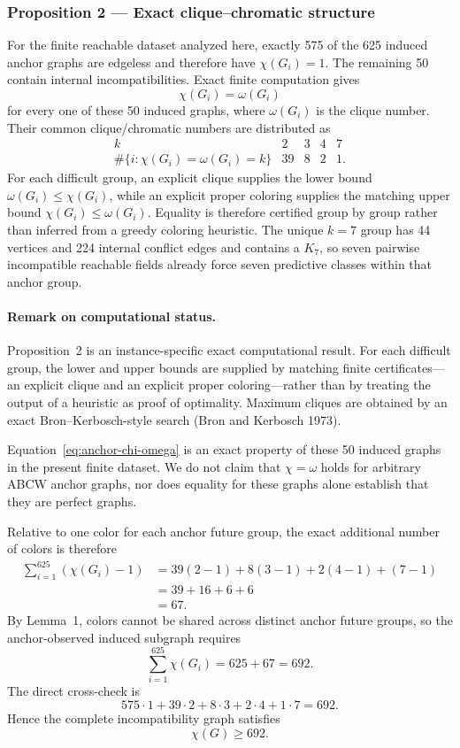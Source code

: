 \documentclass[
  11pt,
]{article}
\begin{document}
\subsubsection{Proposition 2 --- Exact clique--chromatic structure}\label{prop-anchor-cliques}

For the finite reachable dataset analyzed here, exactly 575 of the 625
induced anchor graphs are edgeless and therefore have \(\chi(G_i)=1\).
The remaining 50 contain internal incompatibilities.  Exact finite
computation gives
\[
 \chi(G_i)=\omega(G_i)
 \tag{22}\label{eq:anchor-chi-omega}
\]
for every one of these 50 induced graphs, where \(\omega(G_i)\) is the
clique number.  Their common clique/chromatic numbers are distributed as
\[
\begin{array}{c|rrrr}
 k&2&3&4&7\\ \hline
 \#\{i:\chi(G_i)=\omega(G_i)=k\}&39&8&2&1.
\end{array}
 \tag{23}\label{eq:difficult-group-distribution}
\]
For each difficult group, an explicit clique supplies the lower bound
\(\omega(G_i)\le\chi(G_i)\), while an explicit proper coloring supplies
the matching upper bound \(\chi(G_i)\le\omega(G_i)\).  Equality is
therefore certified group by group rather than inferred from a greedy
coloring heuristic.  The unique \(k=7\) group has 44 vertices and 224
internal conflict edges and contains a \(K_7\), so seven pairwise
incompatible reachable fields already force seven predictive classes
within that anchor group.

\paragraph{Remark on computational status.}
Proposition~2 is an instance-specific exact computational result. For
each difficult group, the lower and upper bounds are supplied by
matching finite certificates---an explicit clique and an explicit proper
coloring---rather than by treating the output of a heuristic as proof of
optimality. Maximum cliques are obtained by an exact Bron--Kerbosch-style
search (Bron and Kerbosch 1973).

Equation~\eqref{eq:anchor-chi-omega} is an exact property of these 50
induced graphs in the present finite dataset.  We do not claim that
\(\chi=\omega\) holds for arbitrary ABCW anchor graphs, nor does equality
for these graphs alone establish that they are perfect graphs.

Relative to one color for each anchor future group, the exact additional
number of colors is therefore
\[
\begin{aligned}
 \sum_{i=1}^{625}(\chi(G_i)-1)
 &=39(2-1)+8(3-1)+2(4-1)+(7-1)\\
 &=39+16+6+6\\
 &=67.
\end{aligned}
 \tag{24}\label{eq:additional-67-structural}
\]
By Lemma~1, colors cannot be shared across distinct anchor future groups,
so the anchor-observed induced subgraph requires
\[
 \sum_{i=1}^{625}\chi(G_i)=625+67=692.
 \tag{25}\label{eq:anchor-692-structural}
\]
The direct cross-check is
\[
 575\cdot1+39\cdot2+8\cdot3+2\cdot4+1\cdot7=692.
\]
Hence the complete incompatibility graph satisfies
\[
 \boxed{\chi(G)\ge692}.
\]
\end{document}
